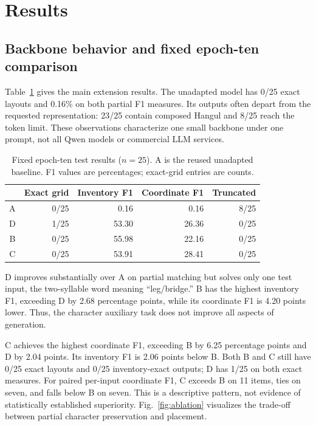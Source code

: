 \documentclass[journal]{IEEEtran}
\begin{document}
\section{Results}
\subsection{Backbone behavior and fixed epoch-ten comparison}
Table~\ref{tab:primary} gives the main extension results. The unadapted model has 0/25 exact layouts and 0.16\% on both partial F1 measures. Its outputs often depart from the requested representation: 23/25 contain composed Hangul and 8/25 reach the token limit. These observations characterize one small backbone under one prompt, not all Qwen models or commercial LLM services.

\begin{table}[t]
\caption{Fixed epoch-ten test results ($n=25$). A is the reused unadapted baseline. F1 values are percentages; exact-grid entries are counts.}
\label{tab:primary}\centering
\begin{tabular}{@{}crrrr@{}}\toprule
 & Exact grid & Inventory F1 & Coordinate F1 & Truncated \\\midrule
A & 0/25 & 0.16 & 0.16 & 8/25 \\
D & 1/25 & 53.30 & 26.36 & 0/25 \\
B & 0/25 & 55.98 & 22.16 & 0/25 \\
C & 0/25 & 53.91 & 28.41 & 0/25 \\\bottomrule
\end{tabular}
\end{table}

D improves substantially over A on partial matching but solves only one test input, the two-syllable word meaning ``leg/bridge.'' B has the highest inventory F1, exceeding D by 2.68 percentage points, while its coordinate F1 is 4.20 points lower. Thus, the character auxiliary task does not improve all aspects of generation.

C achieves the highest coordinate F1, exceeding B by 6.25 percentage points and D by 2.04 points. Its inventory F1 is 2.06 points below B. Both B and C still have 0/25 exact layouts and 0/25 inventory-exact outputs; D has 1/25 on both exact measures. For paired per-input coordinate F1, C exceeds B on 11 items, ties on seven, and falls below B on seven. This is a descriptive pattern, not evidence of statistically established superiority. Fig.~\ref{fig:ablation} visualizes the trade-off between partial character preservation and placement.
\end{document}
